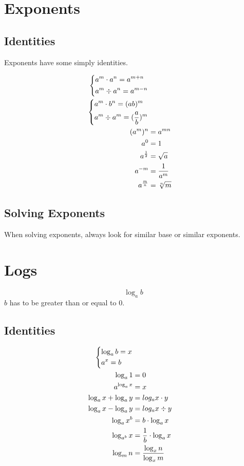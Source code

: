 \documentclass[../notes.tex]{subfiles}
\begin{document}
\section{Exponents}

\subsection{Identities}
Exponents have some simply identities.

\begin{align}
	\begin{dcases}
		a^m \cdot a^n = a^{m+n} \\
		a^m \div a^n = a^{m-n} \\
	\end{dcases} \\
	\begin{dcases}
		a^m \cdot b^n = (ab)^m \\
		a^m \div a^m = (\frac{a}{b})^m \\
	\end{dcases} \\
	(a^m)^n &= a^{mn} \\
	a^0 &= 1 \\
	a^{\frac{1}{2}} &= \sqrt{a} \\
	a^{-m} &= \frac{1}{a^m} \\
	a^{\frac{m}{n}} &= \sqrt[n]{m}
\end{align} 

\subsection{Solving Exponents}
When solving exponents, always look for similar base or similar exponents.

\section{Logs}
\begin{equation}
	\log_a{b}
\end{equation}
$b$ has to be greater than or equal to 0.

\subsection{Identities}
\begin{align}
	\begin{dcases}
	\log_a{b} = x \\
	a^x = b
	\end{dcases} \\
	\log_a{1} &= 0 \\
	a^{\log_a{x}} &= x \\
	\log_a{x} + \log_a{y} &= log_a{x\cdot y} \\
	\log_a{x} - \log_a{y} &= log_a{x\div y} \\
	\log_a{x^b} &= b\cdot\log_a{x} \\
	\log_{a^b}{x} &= \frac{1}{b}\cdot\log_a{x} \\
	\log_m{n} &= \frac{\log_x{n}}{\log_x{m}}
\end{align} 
\end{document}

